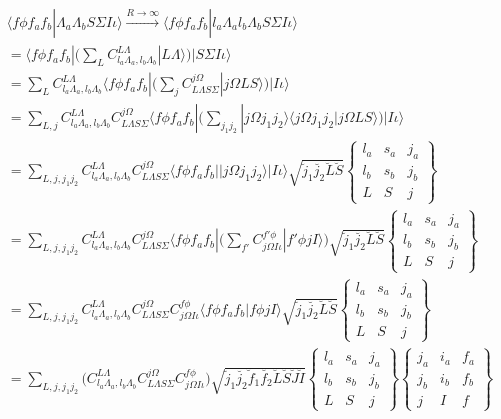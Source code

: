 \documentclass[prl, longbibliography, aps, 10pt]{revtex4-2}
\begin{document}
\begin{equation}
\begin{split}
\langle f \phi f_a f_b |\Lambda_a \Lambda_b S\Sigma I\iota\rangle
\xrightarrow{R\rightarrow\infty}
\langle f \phi f_a f_b |l_a\Lambda_a l_b\Lambda_b S\Sigma I\iota\rangle\\
= \langle f \phi f_a f_b | \Bigg(\sum_{L} C^{L\Lambda}_{l_a \Lambda_a, l_b \Lambda_b} |L \Lambda\rangle\Bigg) | S\Sigma I\iota\rangle\\
= \sum_{L} C^{L\Lambda}_{l_a \Lambda_a, l_b \Lambda_b} \langle f \phi f_a f_b | \Big(\sum_{j}C_{L\Lambda S\Sigma}^{j\Omega} |j\Omega L S\rangle\Big) | I\iota\rangle\\
= \sum_{L, j} C^{L\Lambda}_{l_a \Lambda_a, l_b \Lambda_b} C_{L\Lambda S\Sigma}^{j\Omega} \langle f \phi f_a f_b | \Bigg(\sum_{j_1 j_2} |j\Omega j_1 j_2 \rangle\langle j\Omega j_1 j_2 |j\Omega L S\rangle\Bigg) | I\iota\rangle\\
= \sum_{L, j, j_1 j_2} 
C^{L\Lambda}_{l_a \Lambda_a, l_b \Lambda_b} 
C_{L\Lambda S\Sigma}^{j\Omega} 
\langle f \phi f_a f_b | |j\Omega j_1 j_2 \rangle | I\iota\rangle
\sqrt{\breve{j}_1\breve{j_2}\breve{L}\breve{S}}
\begin{Bmatrix}
l_a & s_a & j_a\\
l_b & s_b & j_b\\
L & S & j
\end{Bmatrix}\\
= \sum_{L, j, j_1 j_2} 
C^{L\Lambda}_{l_a \Lambda_a, l_b \Lambda_b} 
C_{L\Lambda S\Sigma}^{j\Omega} 
\langle f \phi f_a f_b | \Bigg(\sum_{f'} C_{j\Omega I \iota}^{f' \phi} |f' \phi j I\rangle\Bigg)
\sqrt{\breve{j}_1\breve{j_2}\breve{L}\breve{S}}
\begin{Bmatrix}
l_a & s_a & j_a\\
l_b & s_b & j_b\\
L & S & j
\end{Bmatrix}\\
= \sum_{L, j, j_1 j_2} 
C^{L\Lambda}_{l_a \Lambda_a, l_b \Lambda_b} 
C_{L\Lambda S\Sigma}^{j\Omega} 
 C_{j\Omega I \iota}^{f \phi}
\langle f \phi f_a f_b |f \phi j I\rangle
\sqrt{\breve{j}_1\breve{j_2}\breve{L}\breve{S}}
\begin{Bmatrix}
l_a & s_a & j_a\\
l_b & s_b & j_b\\
L & S & j
\end{Bmatrix}\\
= \sum_{L, j, j_1 j_2} 
\bigg(
C^{L\Lambda}_{l_a \Lambda_a, l_b \Lambda_b} 
C_{L\Lambda S\Sigma}^{j\Omega} 
C_{j\Omega I \iota}^{f \phi}
\bigg)
\sqrt{\breve{j}_1\breve{j_2}\breve{f}_1\breve{f_2}
\breve{L}\breve{S}\breve{J}\breve{I}}
\begin{Bmatrix}
l_a & s_a & j_a\\
l_b & s_b & j_b\\
L & S & j
\end{Bmatrix}
\begin{Bmatrix}
j_a & i_a & f_a\\
j_b & i_b & f_b\\
j & I & f
\end{Bmatrix}
\end{split}
\end{equation}
\end{document}
